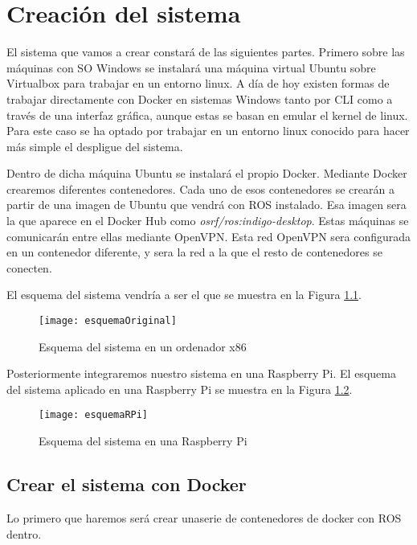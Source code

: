 \chapter{Creación del sistema}

El sistema que vamos a crear constará de las siguientes partes. Primero sobre las máquinas con SO Windows se instalará una máquina virtual Ubuntu sobre Virtualbox para trabajar en un entorno linux. A día de hoy existen formas de trabajar directamente con Docker en sistemas Windows tanto por CLI como a través de una interfaz gráfica, aunque estas se basan en emular el kernel de linux. Para este caso se ha optado por trabajar en un entorno linux conocido para hacer más simple el despligue del sistema.

Dentro de dicha máquina Ubuntu se instalará el propio Docker. Mediante Docker crearemos diferentes contenedores. Cada uno de esos contenedores se crearán a partir de una imagen de Ubuntu que vendrá con ROS instalado. Esa imagen sera la que aparece en el Docker Hub como \emph{osrf/ros:indigo-desktop}. Estas máquinas se comunicarán entre ellas mediante OpenVPN. Esta red OpenVPN sera configurada en un contenedor diferente, y sera la red a la que el resto de contenedores se conecten.

El esquema del sistema vendría a ser el que se muestra en la Figura \ref{fig:esquemaOriginal}.
\begin{figure}[H] %
	\centering
	\texttt{[image: esquemaOriginal]}
	\caption{Esquema del sistema en un ordenador x86}
	\label{fig:esquemaOriginal}
\end{figure}

Posteriormente integraremos nuestro sistema en una Raspberry Pi. El esquema del sistema aplicado en una Raspberry Pi se muestra en la Figura \ref{fig:esquemaRPi}.
\begin{figure}[H]
	\centering
	\texttt{[image: esquemaRPi]}
	\caption{Esquema del sistema en una Raspberry Pi}
	\label{fig:esquemaRPi}
\end{figure}

	\section{Crear el sistema con Docker}
	Lo primero que haremos será crear unaserie de contenedores de docker con ROS dentro.
	
